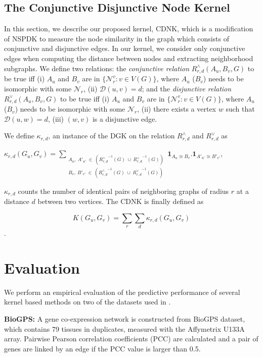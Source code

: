 \documentclass{esannV2}
\begin{document}
\subsection{The Conjunctive Disjunctive Node Kernel}
In this section, we describe our proposed kernel, CDNK, which is a modification of NSPDK to measure the node similarity in the graph which consists of conjunctive and disjunctive edges. In our kernel, we consider only conjunctive edges when computing the distance between nodes and extracting neighborhood subgraphs. We define two relations: the \textit{conjunctive relation} $R^{\wedge}_{r,d}(A_u, B_v, G)$ to be true iff (i) $A_u$ and $B_v$ are in $\lbrace \mathcal{N}_r^v: v \in V(G) \rbrace$, where $A_u$ ($B_v$) needs to be isomorphic with some $\mathcal{N}_r$, (ii) $\mathcal{D}(u,v)= d$; and the \textit{disjunctive relation} $R_{r,d}^{\vee}(A_u, B_v, G)$ to be true iff (i) $A_u$ and $B_v$ are in $\lbrace \mathcal{N}_r^v: v \in V(G) \rbrace$, where $A_u$ ($B_v$) needs to be isomorphic with some $\mathcal{N}_r$,  (ii) there exists a vertex $w$ such that $\mathcal{D}(u,w)= d$, (iii) $(w,v)$ is a disjunctive edge.

We define $\kappa_{r,d}$, an instance of the DGK on the relation $R^{\wedge}_{r,d}$ and $R^{\vee}_{r,d}$ as
\begin{center}
 $\kappa_{r,d}(G_u,G_v) = \!\!\!\!\!\!\!\!\!\!\!\! \sum\limits_{\substack
 {A_u,\ {A'}_{u'} \ \in \ ({R_{r,d}^{\wedge}}^{ -1}(G)\ \cup\  {R_{r,d}^{\vee}}^{ -1}(G)) \\
  B_v,\ {B'}_{v'} \ \in \ ({R_{r,d}^{\wedge}}^{ -1}(G)\ \cup\  {R_{r,d}^{\vee}}^{ -1}(G)) }} \!\!\!\!\!\!\!\!\!\!\!\!
  { \textbf{1}_{A_u \cong B_v}.{ \textbf{1}_{A'_{u'} \cong B'_{v'}}}}$,
\end{center}
$\kappa_{r,d}$ counts the number of identical pairs of neighboring graphs of radius $r$ at a distance $d$ between two vertices. The CDNK is finally defined as 

$$K(G_u,G_v) = \sum\limits_{r}{\sum\limits_{d}{\kappa_{r,d}(G_u,G_v)}}$$.

\section{Evaluation}
\label{evaluation}
We perform an empirical evaluation of the predictive performance of several kernel based methods on two of the datasets used in \cite{medk}.

\textbf{BioGPS:} A gene co-expression network is constructed from BioGPS dataset, which contains 79 tissues in duplicates, measured with the Affymetrix U133A array. Pairwise Pearson correlation coefficients (PCC) are calculated and a pair of genes are linked by an edge if the PCC value is larger than 0.5.
\end{document}
